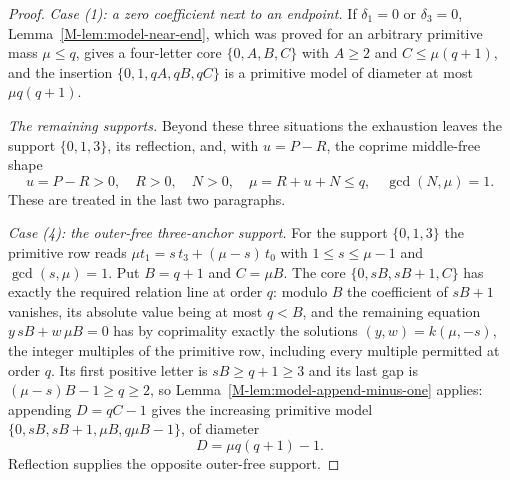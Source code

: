 \documentclass[11pt,reqno]{amsart}
\theoremstyle{plain}
\theoremstyle{definition}
\theoremstyle{plain}
\theoremstyle{plain}
\theoremstyle{plain}
\theoremstyle{plain}
\theoremstyle{plain}
\theoremstyle{plain}
\theoremstyle{definition}
\theoremstyle{definition}
\theoremstyle{definition}
\theoremstyle{plain}
\begin{document}
\begin{proof}
\smallskip\noindent\emph{Case (1): a zero coefficient next to an endpoint.}
If $\delta_1=0$ or $\delta_3=0$, Lemma~\ref{M-lem:model-near-end}, which was
proved for an arbitrary primitive mass $\mu\le q$, gives a four-letter core
$\{0,A,B,C\}$ with $A\ge2$ and $C\le\mu(q+1)$, and the insertion
$\{0,1,qA,qB,qC\}$ is a primitive model of diameter at most $\mu q(q+1)$.

\smallskip\noindent\emph{The remaining supports.}
Beyond these three situations the exhaustion leaves the support
$\{0,1,3\}$, its reflection, and, with $u=P-R$, the coprime middle-free
shape
\begin{equation}\label{M-eq:final-shape}
 u=P-R>0,\quad R>0,\quad N>0,\quad \mu=R+u+N\le q,\quad \gcd(N,\mu)=1 .
\end{equation}
These are treated in the last two paragraphs.

\smallskip\noindent\emph{Case (4): the outer-free three-anchor support.}
For the support $\{0,1,3\}$ the primitive row reads
$\mu t_1=s\,t_3+(\mu-s)\,t_0$ with $1\le s\le\mu-1$ and $\gcd(s,\mu)=1$.
Put $B=q+1$ and $C=\mu B$. The core $\{0,sB,sB+1,C\}$ has exactly the
required relation line at order $q$: modulo $B$ the coefficient of $sB+1$
vanishes, its absolute value being at most $q<B$, and the remaining
equation $y\,sB+w\,\mu B=0$ has by coprimality exactly the solutions
$(y,w)=k(\mu,-s)$, the integer multiples of the primitive row, including
every multiple permitted at order $q$. Its first positive letter is
$sB\ge q+1\ge3$ and its last gap is $(\mu-s)B-1\ge q\ge2$, so
Lemma~\ref{M-lem:model-append-minus-one} applies: appending $D=qC-1$ gives
the increasing primitive model $\{0,sB,sB+1,\mu B,q\mu B-1\}$, of diameter
\begin{equation}\label{M-eq:three-anchor-diameter}
 D=\mu q(q+1)-1 .
\end{equation}
Reflection supplies the opposite outer-free support.


\end{proof}
\end{document}
